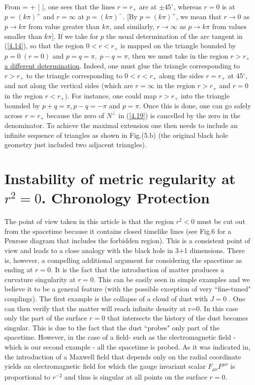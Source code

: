 {}From
\bb
{} =   +
\ln\left| \right|,
\label{4.20}
\ee
%
one sees that the lines $r=r_{+}$ are at $\pm
45^{\circ}$, whereas $r=0$ is at $p=(k \pi)^{+}$ and
$r=\infty$ at $p=(k \pi)^{-}$. [By $p = (k \pi)^{+}$, we
mean that $r \rightarrow 0$ as $p \rightarrow k \pi$ from
value greater than $k \pi$, and similarly, $r \rightarrow
\infty$ as $p \rightarrow k \pi$ from
values smaller than $k \pi$].  If we take for $p$ the usual
determination of the arc tangent in (\ref{4.14}), so that the
region $0<r<r_{+}$ is mapped on the triangle bounded by $p=0 \;
(r=0)$ and $p = q = \pi, \; p-q = \pi$, then we must take in the
region $r>r_{+}$ \underline{a different determination}. Indeed,
one must glue the triangle corresponding to $r > r_{+}$ to the
triangle corresponding to $0<r<r_{+}$ along the sides $r=r_{+}$
at 45$^{\circ}$, and not along the vertical sides (which are $r=
\infty$ in the region $r>r_+$ and $r=0$ in the region $r<r_{+})$. For
instance, one could map $r>r_{+}$ into the triangle bounded by
$p+q=\pi, p-q= - \pi$ and $p=\pi$. Once this is done, one can go
safely across $r=r_{+}$ because the zero of $N^{\perp}$ in
(\ref{4.19}) is cancelled by the zero in the denominator. To
achieve the maximal extension one then needs to include an
infinite sequence of triangles as shown in Fig.(5.b) (the
original black hole geometry just included two adjacent
triangles).


\section{Instability of metric regularity at $r^2=0$. \newline
Chronology Protection}

 The point of view taken in this article is that the region $r^2<0$  must be
cut out from the spacetime because it contains
closed timelike lines (see Fig.6 for a Penrose diagram that includes the
forbidden region). This is a consistent point of view and leads to a close
analogy with the black hole in  3+1 dimensions. There is, however, a
compelling additional argument for considering the spacetime as ending at
$r=0$. It is the fact that the introduction of matter produces a curvature
singularity at $r=0$. This can be easily seen in simple examples and we
believe it to be a general feature (with the possible exception of very
``fine-tuned" couplings).
  The first example is the collapse of a cloud of dust with $J=0$ \cite{12}.
One can then verify that the matter will reach infinite density at r=0.
In this case only the part of the surface $r=0$ that intersects the history
of the dust becomes singular. This is due to the fact that the dust ``probes"
only part of the spacetime. However, in the case of a field- such as the
electromagnetic field - which is our second example - all the spacetime is
 probed.
   As it was indicated in\cite{1}, the introduction of a Maxwell field that
depends
only on the radial coordinate yields an electromagnetic field for which
the gauge invariant scalar $F_{\mu \nu} F^{\mu \nu}$ is proportional to
$r^{-2}$ and thus is singular at all points on the surface $r=0.$

